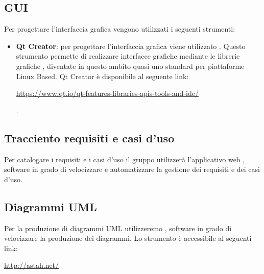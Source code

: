 \documentclass[../NomeDocumento.tex]{subfiles}
\begin{document}
\subsection{GUI}

Per progettare l'interfaccia grafica vengono utilizzati i seguenti strumenti:

\begin{itemize}
	\item \textbf{Qt Creator}: per progettare l'interfaccia grafica viene utilizzato . Questo strumento permette di realizzare interfacce grafiche mediante le librerie grafiche , diventate in questo ambito quasi uno standard per piattaforme Linux Based. Qt Creator è disponibile al seguente link: \\  \centerline{\url{https://www.qt.io/qt-features-libraries-apis-tools-and-ide/}}. 
\end{itemize}

\subsection{Tracciento requisiti e casi d'uso}

Per catalogare i requisiti e i casi d'uso il gruppo utilizzerà l'applicativo web , software in grado di velocizzare e automatizzare la gestione dei requisiti e dei casi d'uso.

\subsection{Diagrammi UML}

Per la produzione di diagrammi UML utilizzeremo , software in grado di velocizzare la produzione dei diagrammi. Lo strumento è accessibile al seguenti link: \\ \centerline{\url{http://astah.net/}}	
\end{document}
